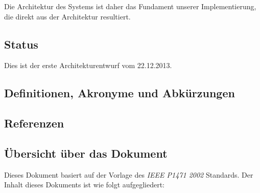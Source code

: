 \documentclass[fontsize=12pt,paper=a4,twoside]{scrartcl}
\begin{document}
Die Architektur des Systems ist daher das Fundament unserer Implementierung, die direkt aus der Architektur resultiert.


\subsection{Status}

Dies ist der erste Architekturentwurf vom 22.12.2013.
\subsection{Definitionen, Akronyme und Abkürzungen}

\subsection{Referenzen}

\subsection{Übersicht über das Dokument}

Dieses Dokument basiert auf der Vorlage des \textit{IEEE P1471 2002} Standards. Der Inhalt dieses Dokuments ist wie folgt aufgegliedert:
\end{document}
